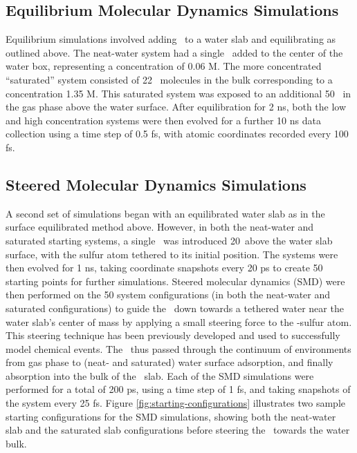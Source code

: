 \subsection{Equilibrium Molecular Dynamics Simulations}

Equilibrium simulations involved adding \suldiox~to a water slab and equilibrating as outlined above. The neat-water system had a single \suldiox~added to the center of the water box, representing a concentration of 0.06 M. The more concentrated ``saturated'' system consisted of 22 \suldiox~molecules in the bulk corresponding to a concentration 1.35 M. This saturated system was exposed to an additional 50 \suldiox~in the gas phase above the water surface. After equilibration for 2 ns, both the low and high concentration systems were then evolved for a further 10 ns data collection using a time step of 0.5 fs, with atomic coordinates recorded every 100 fs.

\subsection{Steered Molecular Dynamics Simulations}

A second set of simulations began with an equilibrated water slab as in the surface equilibrated method above. However, in both the neat-water and saturated starting systems, a single \suldiox~was introduced 20\angs~above the water slab surface, with the sulfur atom tethered to its initial position. The systems were then evolved for 1 ns, taking coordinate snapshots every 20 ps to create 50 starting points for further simulations. Steered molecular dynamics (SMD) were then performed on the 50 system configurations (in both the neat-water and saturated configurations) to guide the \suldiox~down towards a tethered water near the water slab's center of mass by applying a small steering force to the \suldiox-sulfur atom. This steering technique has been previously developed and used to successfully model chemical events.\cite{Isralewitz2001,Giorgino2011,Bizzarri2011,Strzelecki2009,Patargias2009,Liu2006} The \suldiox~thus passed through the continuum of environments from gas phase to (neat- and saturated) water surface adsorption, and finally absorption into the bulk of the \wat~slab. Each of the SMD simulations were performed for a total of 200 ps, using a time step of 1 fs, and taking snapshots of the system every 25 fs. Figure \ref{fig:starting-configurations} illustrates two sample starting configurations for the SMD simulations, showing both the neat-water slab and the saturated slab configurations before steering the \suldiox~towards the water bulk.

